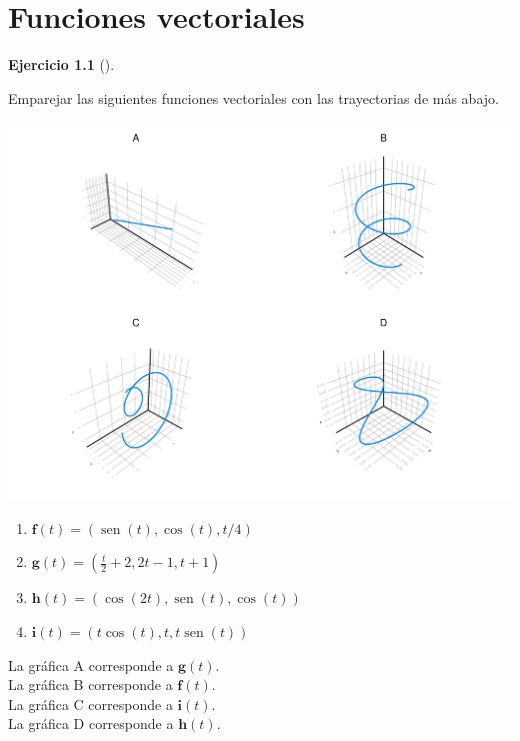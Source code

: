 \documentclass[
  a4paper,
]{scrreport}
\theoremstyle{definition}
\newtheorem{exercise}{Ejercicio}[chapter]
\theoremstyle{remark}
\begin{document}

\chapter{Funciones vectoriales}\label{funciones-vectoriales}

\begin{exercise}[]\protect\hypertarget{exr-trayectorias-funciones-vectoriales}{}\label{exr-trayectorias-funciones-vectoriales}

Emparejar las siguientes funciones vectoriales con las trayectorias de
más abajo.

\includegraphics{img/funciones-vectoriales/trayectorias-espacio.pdf}

\begin{enumerate}
\def\labelenumi{\alph{enumi}.}
\item
  \(\mathbf{f}(t) = (\operatorname{sen}(t), \cos(t), t/4)\)
\item
  \(\mathbf{g}(t) = \left(\frac{t}{2}+2, 2t-1, t+1\right)\)
\item
  \(\mathbf{h}(t) = (\cos(2t), \operatorname{sen}(t), \cos(t))\)
\item
  \(\mathbf{i}(t) = (t\cos(t), t, t\operatorname{sen}(t))\)
\end{enumerate}

\end{exercise}

\begin{tcolorbox}[enhanced jigsaw, left=2mm, coltitle=black, colbacktitle=quarto-callout-tip-color!10!white, opacitybacktitle=0.6, colback=white, breakable, titlerule=0mm, toptitle=1mm, rightrule=.15mm, bottomtitle=1mm, bottomrule=.15mm, toprule=.15mm, leftrule=.75mm, arc=.35mm, opacityback=0, title=\textcolor{quarto-callout-tip-color}{\faLightbulb}\hspace{0.5em}{Solución}, colframe=quarto-callout-tip-color-frame]

La gráfica A corresponde a \(\mathbf{g}(t)\).\\
La gráfica B corresponde a \(\mathbf{f}(t)\).\\
La gráfica C corresponde a \(\mathbf{i}(t)\).\\
La gráfica D corresponde a \(\mathbf{h}(t)\).

\end{tcolorbox}
\end{document}
